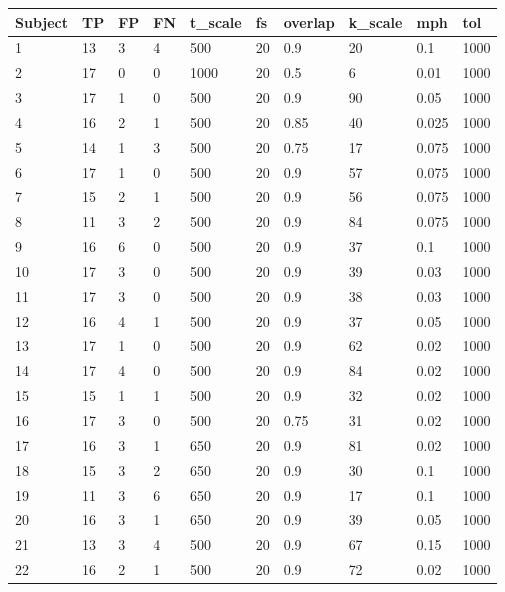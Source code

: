 \begin{table*}[h!]
	\begin{adjustbox}{width=\textwidth}
	\centering
    \begin{tabular}{l|lllllllll}
    \toprule[0.5mm]
        Subject & TP & FP & FN & t\_scale & fs & overlap & k\_scale & mph & tol\\
        \midrule[0.3mm]
        1& 13 & 3 & 4 & 500 & 20 & 0.9 & 20 & 0.1 & 1000 \\ 
        2& 17 & 0 & 0 & 1000 & 20 & 0.5 & 6 & 0.01 & 1000 \\ 
        3& 17 & 1 & 0 & 500 & 20 & 0.9 & 90 & 0.05 & 1000 \\ 
        4& 16 & 2 & 1 & 500 & 20 & 0.85 & 40 & 0.025 & 1000 \\ 
        5& 14 & 1 & 3 & 500 & 20 & 0.75 & 17 & 0.075 & 1000 \\ 
        6& 17 & 1 & 0 & 500 & 20 & 0.9 & 57 & 0.075 & 1000 \\ 
        7& 15 & 2 & 1 & 500 & 20 & 0.9 & 56 & 0.075 & 1000 \\ 
        8& 11 & 3 & 2 & 500 & 20 & 0.9 & 84 & 0.075 & 1000 \\ 
        9& 16 & 6 & 0 & 500 & 20 & 0.9 & 37 & 0.1 & 1000 \\ 
        10& 17 & 3 & 0 & 500 & 20 & 0.9 & 39 & 0.03 & 1000 \\ 
        11& 17 & 3 & 0 & 500 & 20 & 0.9 & 38 & 0.03 & 1000 \\ 
        12& 16 & 4 & 1 & 500 & 20 & 0.9 & 37 & 0.05 & 1000 \\ 
        13& 17 & 1 & 0 & 500 & 20 & 0.9 & 62 & 0.02 & 1000 \\ 
        14& 17 & 4 & 0 & 500 & 20 & 0.9 & 84 & 0.02 & 1000 \\ 
        15& 15 & 1 & 1 & 500 & 20 & 0.9 & 32 & 0.02 & 1000 \\ 
        16& 17 & 3 & 0 & 500 & 20 & 0.75 & 31 & 0.02 & 1000 \\ 
        17& 16 & 3 & 1 & 650 & 20 & 0.9 & 81 & 0.02 & 1000 \\ 
        18& 15 & 3 & 2 & 650 & 20 & 0.9 & 30 & 0.1 & 1000\\ 
        19& 11 & 3 & 6 & 650 & 20 & 0.9 & 17 & 0.1 & 1000\\ 
        20& 16 & 3 & 1 & 650 & 20 & 0.9 & 39 & 0.05 & 1000\\ 
        21& 13 & 3 & 4 & 500 & 20 & 0.9 & 67 & 0.15 & 1000 \\ 
        22& 16 & 2 & 1 & 500 & 20 & 0.9 & 72 & 0.02 & 1000 \\ 

\end{tabular}
\end{adjustbox}
\end{table*}
